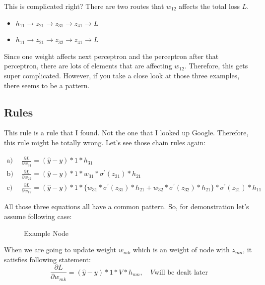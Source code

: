 \documentclass{homework}
\begin{document}
This is complicated right? There are two routes that $w_{12}$ affects the total loss $L$.
\begin{itemize}
    \item $h_{11} \rightarrow z_{21} \rightarrow z_{31} \rightarrow z_{41} \rightarrow L$
    \item $h_{11} \rightarrow z_{21} \rightarrow z_{32} \rightarrow z_{41} \rightarrow L$
\end{itemize}

Since one weight affects next perceptron and the perceptron after that perceptron, there are lots of elements that are affecting $w_{12}$. Therefore, this gets super complicated. However, if you take a close look at those three examples, there seems to be a pattern.
\pagebreak

\subsection{Rules}\label{rules}
This rule is a rule that I found. Not the one that I looked up Google. Therefore, this rule might be totally wrong. Let's see those chain rules again:

\[
    \begin{aligned}
        \text{a) } &\frac{\partial L}{\partial w_{31}} = (\hat{y} - y)*1*h_{31} \\
        \text{b) } &\frac{\partial L}{\partial w_{22}} = (\hat{y} - y)*1*w_{31}*\sigma^\prime(z_{31})*h_{21} \\
        \text{c) } &\frac{\partial L}{\partial w_{12}} = (\hat{y} - y)*1*\{w_{31}*\sigma^\prime(z_{31})*h_{21} + w_{32}*\sigma^\prime(z_{32})*h_{21}\} * \sigma^\prime(z_{21})*h_{11}
    \end{aligned}
\]

All those three equations all have a common pattern. So, for demonstration let's assume following case:
\begin{figure}[h]
    \centering
    \caption{Example Node}
    \label{fig:my_label}
\end{figure}

When we are going to update weight $w_{mk}$ which is an weight of node with $z_{mn}$, it satisfies following statement:
\[
    \frac{\partial L}{\partial w_{mk}} = (\hat{y} - y) * 1 * V * h_{mn}, \quad V \text{will be dealt later}
\]
\end{document}
